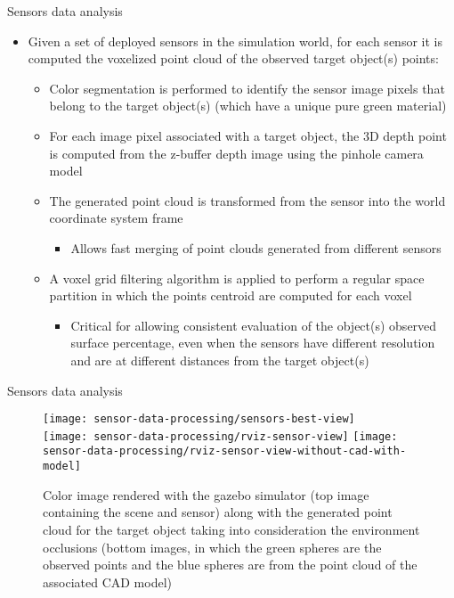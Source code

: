 \begin{frame}{Sensors data analysis}
	\begin{itemize}
		\item Given a set of deployed sensors in the simulation world, for each sensor it is computed the voxelized point cloud of the observed target object(s) points:
		\begin{itemize}
			\item Color segmentation is performed to identify the sensor image pixels that belong to the target object(s) (which have a unique pure green material)
			\item For each image pixel associated with a target object, the 3D depth point is computed from the z-buffer depth image using the pinhole camera model
			\item The generated point cloud is transformed from the sensor into the world coordinate system frame
			\begin{itemize}
				\item Allows fast merging of point clouds generated from different sensors
			\end{itemize}
			\item A voxel grid filtering algorithm is applied to perform a regular space partition in which the points centroid are computed for each voxel
			\begin{itemize}
				\item Critical for allowing consistent evaluation of the object(s) observed surface percentage, even when the sensors have different resolution and are at different distances from the target object(s)
			\end{itemize}
		\end{itemize}
	\end{itemize}
\end{frame}


\begin{frame}{Sensors data analysis}
	\begin{figure}
		\centering
		\texttt{[image: sensor-data-processing/sensors-best-view]}\\
		\vspace{0.5em}
		\texttt{[image: sensor-data-processing/rviz-sensor-view]}\hspace{2em}
		\texttt{[image: sensor-data-processing/rviz-sensor-view-without-cad-with-model]}
		\caption{Color image rendered with the gazebo simulator (top image containing the scene and sensor) along with the generated point cloud for the target object taking into consideration the environment occlusions (bottom images, in which the green spheres are the observed points and the blue spheres are from the point cloud of the associated CAD model)}
	\end{figure}
\end{frame}


